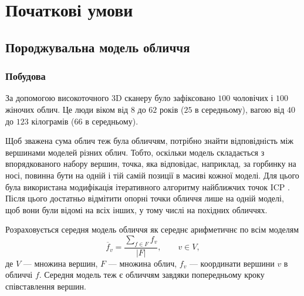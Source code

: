 \section{Початкові умови}

\subsection{Породжувальна модель обличчя}

\subsubsection{Побудова}

За допомогою високоточного 3D сканеру
було зафіксовано $100$ чоловічих і $100$ жіночих облич.
Це люди віком від $8$ до $62$ років ($25$ в середньому),
вагою від $40$ до $123$ кілограмів ($66$ в середньому).

Щоб зважена сума облич теж була обличчям,
потрібно знайти відповідність між вершинами моделей різних облич.
Тобто, оскільки модель складається з впорядкованого набору вершин,
точка, яка відповідає, наприклад, за горбинку на носі,
повинна бути на одній і тій самій позиції в масиві кожної моделі.
Для цього була використана модифікація
ітеративного алгоритму найближчих точок ICP \cite{AmbergRV07}.
Після цього достатньо відмітити опорні точки обличчя лише на одній моделі,
щоб вони були відомі на всіх інших,
у тому числі на похідних обличчях.

Розраховується середня модель обличчя як середнє арифметичнє по всім моделям
\begin{equation*}
  \overline{f}_v
  = \frac{\sum\limits_{f \in F} f_v}{\left| F \right|},\qquad
  v \in V,
\end{equation*}
де $V$ --- множина вершин, $F$ --- множина облич,
$f_v$ --- координати вершини $v$ в обличчі $f$.
Середня модель теж є обличчям завдяки попередньому кроку співставлення вершин.

